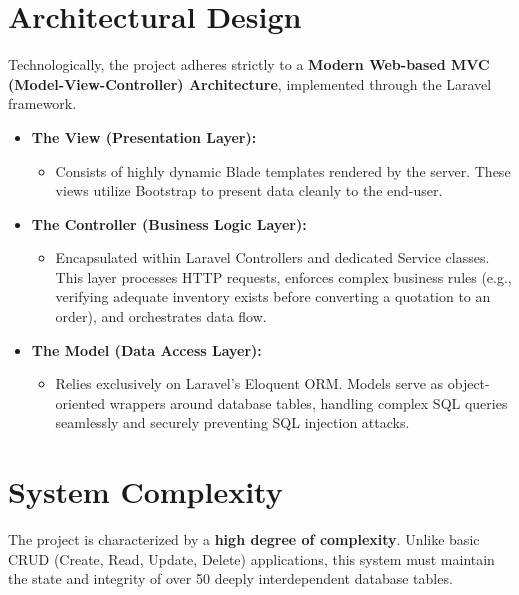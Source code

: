 ﻿\documentclass[12pt,a4paper]{report}
\begin{document}
\section*{Architectural Design}
Technologically, the project adheres strictly to a \textbf{Modern Web-based MVC (Model-View-Controller) Architecture}, implemented through the Laravel framework. 
\begin{itemize}
    \item \textbf{The View (Presentation Layer):}
    \begin{itemize}
        \item Consists of highly dynamic Blade templates rendered by the server. These views utilize Bootstrap to present data cleanly to the end-user.
    \end{itemize}
    \item \textbf{The Controller (Business Logic Layer):}
    \begin{itemize}
        \item Encapsulated within Laravel Controllers and dedicated Service classes. This layer processes HTTP requests, enforces complex business rules (e.g., verifying adequate inventory exists before converting a quotation to an order), and orchestrates data flow.
    \end{itemize}
    \item \textbf{The Model (Data Access Layer):}
    \begin{itemize}
        \item Relies exclusively on Laravel's Eloquent ORM. Models serve as object-oriented wrappers around database tables, handling complex SQL queries seamlessly and securely preventing SQL injection attacks.
    \end{itemize}
\end{itemize}

\section*{System Complexity}
The project is characterized by a \textbf{high degree of complexity}. Unlike basic CRUD (Create, Read, Update, Delete) applications, this system must maintain the state and integrity of over 50 deeply interdependent database tables. 
\end{document}
